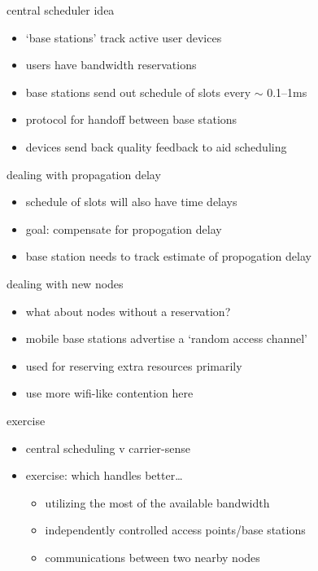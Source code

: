 \begin{frame}{central scheduler idea}
    \begin{itemize}
    \item `base stations' track active user devices
    \item users have bandwidth reservations
    \vspace{.5cm}
    \item base stations send out schedule of slots every $\sim$ 0.1--1ms
    \item protocol for handoff between base stations
    \item devices send back quality feedback to aid scheduling
    \end{itemize}
\end{frame}

\begin{frame}{dealing with propagation delay}
    \begin{itemize}
    \item schedule of slots will also have time delays
    \item goal: compensate for propogation delay
    \vspace{.5cm}
    \item base station needs to track estimate of propogation delay
    \end{itemize}
\end{frame}

\begin{frame}{dealing with new nodes}
    \begin{itemize}
    \item what about nodes without a reservation?
    \vspace{.5cm}
    \item mobile base stations advertise a `random access channel'
    \item used for reserving extra resources primarily
    \item use more wifi-like contention here
    \end{itemize}
\end{frame}

\begin{frame}{exercise}
    \begin{itemize}
    \item central scheduling v carrier-sense
    \vspace{.5cm}
    \item exercise: which handles better\ldots
        \begin{itemize}
        \item utilizing the most of the available bandwidth
        \item independently controlled access points/base stations
        \item communications between two nearby nodes
        \end{itemize}
    \end{itemize}
\end{frame}
